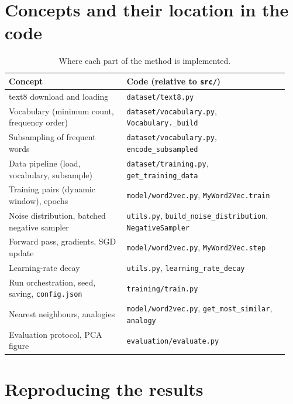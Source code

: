 \section{Concepts and their location in the code}
\label{app:code}

\begin{table}[H]
    \centering
    \small
    \begin{tabular}{>{\raggedright\arraybackslash}p{0.4\linewidth}>{\raggedright\arraybackslash}p{0.55\linewidth}}
        \toprule
        Concept & Code (relative to \texttt{src/}) \\
        \midrule
        text8 download and loading & \texttt{dataset/text8.py} \\
        Vocabulary (minimum count, frequency order) & \texttt{dataset/vocabulary.py}, \texttt{Vocabulary.\_build} \\
        Subsampling of frequent words & \texttt{dataset/vocabulary.py}, \texttt{encode\_subsampled} \\
        Data pipeline (load, vocabulary, subsample) & \texttt{dataset/training.py}, \texttt{get\_training\_data} \\
        Training pairs (dynamic window), epochs & \texttt{model/word2vec.py}, \texttt{MyWord2Vec.train} \\
        Noise distribution, batched negative sampler & \texttt{utils.py}, \texttt{build\_noise\_distribution}, \texttt{NegativeSampler} \\
        Forward pass, gradients, SGD update & \texttt{model/word2vec.py}, \texttt{MyWord2Vec.step} \\
        Learning-rate decay & \texttt{utils.py}, \texttt{learning\_rate\_decay} \\
        Run orchestration, seed, saving, \texttt{config.json} & \texttt{training/train.py} \\
        Nearest neighbours, analogies & \texttt{model/word2vec.py}, \texttt{get\_most\_similar}, \texttt{analogy} \\
        Evaluation protocol, PCA figure & \texttt{evaluation/evaluate.py} \\
        \bottomrule
    \end{tabular}
    \caption{Where each part of the method is implemented.}
\end{table}

\section{Reproducing the results}
\label{app:reproduce}

